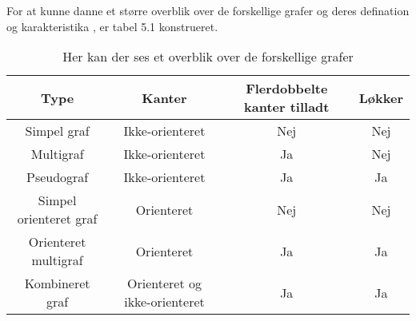 \noindent For at kunne danne et større overblik over de forskellige grafer og deres defination og karakteristika , er tabel 5.1 konstrueret.

\begin{table}[h]
\begin{tabular}{|c|c|c|c|}
\hline 
Type & Kanter & Flerdobbelte kanter tilladt & Løkker \\ 
\hline
Simpel graf & Ikke-orienteret & Nej & Nej	 \\ 

Multigraf & Ikke-orienteret & Ja & Nej \\ 

Pseudograf & Ikke-orienteret & Ja & Ja \\ 
 
Simpel orienteret graf & Orienteret & Nej & Nej \\ 
 
Orienteret multigraf & Orienteret & Ja & Ja \\ 
 
Kombineret graf & Orienteret og ikke-orienteret & Ja & Ja \\ 
\hline 
\end{tabular}
\caption{Her kan der ses et overblik over de forskellige grafer} \label{table:graf_oversigt}
\end{table}



 